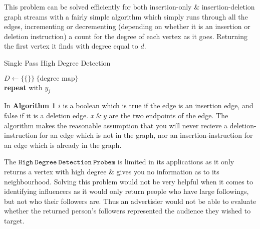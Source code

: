 \documentclass[11pt,twoside,a4paper]{report}
\begin{document}
\vspace{.3cm}\begin{adjustwidth}{.3cm}{}\end{adjustwidth}\vspace{.3cm}
\par This problem can be solved efficiently for both insertion-only \& insertion-deletion graph streams with a fairly simple algorithm which simply runs through all the edges, incrementing or decrementing (depending on whether it is an insertion or deletion instruction)  a count for the degree of each vertex as it goes. Returning the first vertex it finds with degree equal to $d$.\\
\begin{algorithm}[H]
\caption{Single Pass High Degree Detection}
$D\leftarrow\{\{\}\}\ \{\text{degree map}\}$\\
 {
	\textbf{repeat} with $y_j$
}
\end{algorithm}\vspace{.3cm}
In \textbf{Algorithm 1} $i$ is a boolean which is true if the edge is an insertion edge, and false if it is a deletion edge. $x\ \&\ y$ are the two endpoints of the edge. The algorithm makes the reasonable assumption that you will never recieve a deletion-instruction for an edge which is not in the graph, nor an insertion-instruction for an edge which is already in the graph.
\par The $\mathtt{High\ Degree\ Detection\ Probem}$ is limited in its applications as it only returns a vertex with high degree \& gives you no information as to its neighbourhood. Solving this problem would not be very helpful when it comes to identifying influencers as it would only return people who have large followings, but not who their followers are. Thus an advertisier would not be able to evaluate whether the returned person's followers represented the audience they wished to target.
\end{document}
